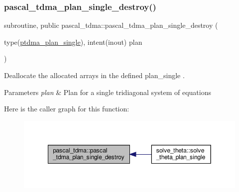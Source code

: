 \subsubsection{\texorpdfstring{pascal\+\_\+tdma\+\_\+plan\+\_\+single\+\_\+destroy()}{pascal\_tdma\_plan\_single\_destroy()}}
{\footnotesize\ttfamily subroutine, public pascal\+\_\+tdma\+::pascal\+\_\+tdma\+\_\+plan\+\_\+single\+\_\+destroy (\begin{DoxyParamCaption}\item[{type(\hyperlink{structpascal__tdma_1_1ptdma__plan__single}{ptdma\+\_\+plan\+\_\+single}), intent(inout)}]{plan }\end{DoxyParamCaption})}



Deallocate the allocated arrays in the defined plan\+\_\+single . 


\begin{DoxyParams}{Parameters}
{\em plan} & Plan for a single tridiagonal system of equations \\
\hline
\end{DoxyParams}
Here is the caller graph for this function\+:
\nopagebreak
\begin{figure}[H]
\begin{center}
\leavevmode
\includegraphics[width=349pt]{namespacepascal__tdma_adb04e59c740ce6c4b9518dd86eaeb594_icgraph}
\end{center}
\end{figure}
\mbox{\label{namespacepascal__tdma_ab14e132231d4b53fd65dd333ccc85a50}} 
